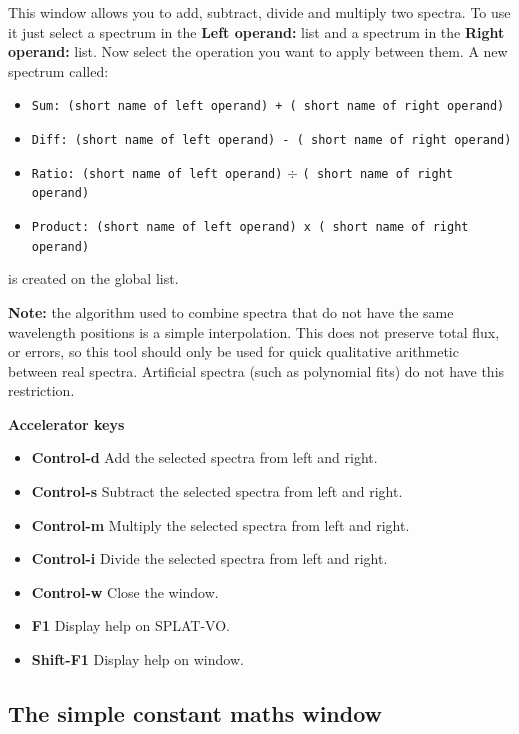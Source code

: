 \documentclass[twoside,11pt]{article}
\renewcommand{\_}{\texttt{\symbol{95}}}
\newcommand{\SPLAT}{\textsf{SPLAT-VO}}
\newcommand{\labelitem}[1]{\textbf{#1}}
\newcommand{\hitext}[1]{\texttt{#1}}
\newcommand{\subheading}[1]{\textbf{\large{#1}}}
\begin{document}
This window allows you to add, subtract, divide and multiply two spectra. To
use it just select a spectrum in the
\labelitem{Left operand:} list and a spectrum in the
\labelitem{Right operand:} list. Now select the operation you want to
apply between them. A new spectrum called:
\begin{itemize}
  \item \hitext{Sum: (short name of left operand) + ( short name of
        right operand)}
  \item \hitext{Diff: (short name of left operand) - ( short name of
        right operand)}
  \item \hitext{Ratio: (short name of left operand)} $\div$ \hitext{( short
        name of right operand)}
  \item \hitext{Product: (short name of left operand) x ( short name
        of right operand)}
\end{itemize}
is created on the global list.

\textbf{Note:} the algorithm used to combine spectra that do not have
the same wavelength positions is a simple interpolation. This does not
preserve total flux, or errors, so this tool should only be used for
quick qualitative arithmetic between real spectra. Artificial spectra
(such as polynomial fits) do not have this restriction.

\subheading{Accelerator keys}

\begin{itemize}
\item \labelitem{Control-d} Add the selected spectra from left and right.
\item \labelitem{Control-s} Subtract the selected spectra from left and right.
\item \labelitem{Control-m} Multiply the selected spectra from left and right.
\item \labelitem{Control-i} Divide the selected spectra from left and right.
\item \labelitem{Control-w} Close the window.
\item \labelitem{F1} Display help on \SPLAT.     
\item \labelitem{Shift-F1} Display help on window.
\end{itemize}


\newpage
\subsection{The simple constant maths window}
\end{document}
